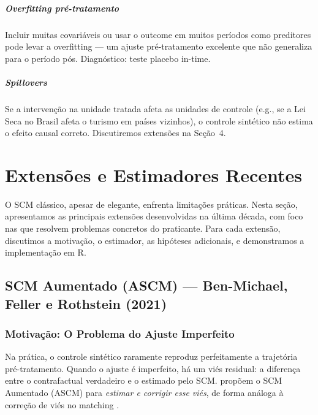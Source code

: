 \documentclass[12pt, a4paper, openany]{book}
\begin{document}
\paragraph{Overfitting pré-tratamento} Incluir muitas covariáveis ou usar o outcome em muitos períodos como preditores pode levar a overfitting --- um ajuste pré-tratamento excelente que não generaliza para o período pós. Diagnóstico: teste placebo in-time.

\paragraph{Spillovers} Se a intervenção na unidade tratada afeta as unidades de controle (e.g., se a Lei Seca no Brasil afeta o turismo em países vizinhos), o controle sintético não estima o efeito causal correto. Discutiremos extensões na Seção~4.


\newpage
\chapter{Extensões e Estimadores Recentes}

O SCM clássico, apesar de elegante, enfrenta limitações práticas. Nesta seção, apresentamos as principais extensões desenvolvidas na última década, com foco nas que resolvem problemas concretos do praticante. Para cada extensão, discutimos a motivação, o estimador, as hipóteses adicionais, e demonstramos a implementação em R.

\section{SCM Aumentado (ASCM) --- Ben-Michael, Feller e Rothstein (2021)}

\subsection{Motivação: O Problema do Ajuste Imperfeito}

Na prática, o controle sintético raramente reproduz perfeitamente a trajetória pré-tratamento. Quando o ajuste é imperfeito, há um viés residual: a diferença entre o contrafactual verdadeiro e o estimado pelo SCM. \cite{BenMichaelEtAl2021} propõem o SCM Aumentado (ASCM) para \textit{estimar e corrigir esse viés}, de forma análoga à correção de viés no matching \citep{Abadie2011}.
\end{document}
